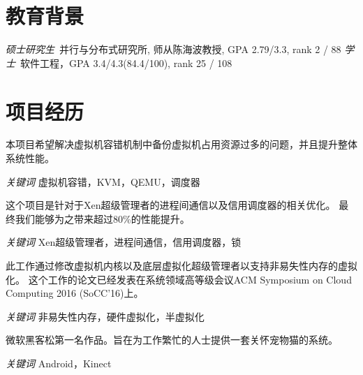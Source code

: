 \documentclass{resume}
\begin{document}


 
\section{教育背景}
\textit{硕士研究生}\ 并行与分布式研究所, 师从陈海波教授, GPA 2.79/3.3, rank 2 / 88
\textit{学士}\ 软件工程，GPA 3.4/4.3(84.4/100), rank 25 / 108

\section{项目经历}

本项目希望解决虚拟机容错机制中备份虚拟机占用资源过多的问题，并且提升整体系统性能。

\textit{关键词} 虚拟机容错，KVM，QEMU，调度器


这个项目是针对于Xen超级管理者的进程间通信以及信用调度器的相关优化。
最终我们能够为之带来超过80\%的性能提升。

\textit{关键词} Xen超级管理者，进程间通信，信用调度器，锁

此工作通过修改虚拟机内核以及底层虚拟化超级管理者以支持非易失性内存的虚拟化。
这个工作的论文已经发表在系统领域高等级会议ACM Symposium on Cloud Computing 2016 (SoCC'16)上。

\textit{关键词}  非易失性内存，硬件虚拟化，半虚拟化

微软黑客松第一名作品。旨在为工作繁忙的人士提供一套关怀宠物猫的系统。

\textit{关键词} Android，Kinect
\end{document}
